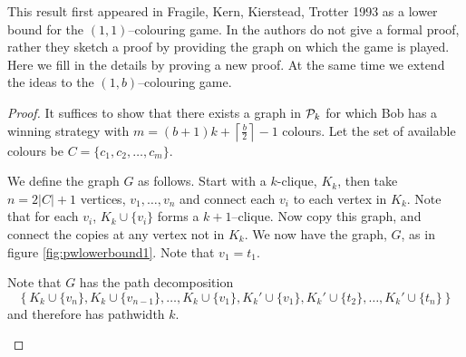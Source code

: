 This result first appeared in Fragile, Kern, Kierstead, Trotter 1993 \cite{faKeKiTr1993} as a lower bound for the $(1,1)$--colouring game. In \cite{faKeKiTr1993} the authors do not give a formal proof, rather they sketch a proof by providing the graph on which the game is played. Here we fill in the details by proving a new proof. At the same time we  extend the ideas to the $(1,b)$--colouring game.
\begin{proof}
    It suffices to show that there exists a graph in $\mathcal{P}_k$ for which Bob has a winning strategy with $m=(b+1)k+\left\lceil\frac{b}{2}\right\rceil-1$ colours. Let the set of available colours be $C=\{c_1,c_2,\dots,c_m\}$.
    
    We define the graph $G$ as follows. Start with a $k$-clique, $K_k$, then take $n=2|C|+1$ vertices, $v_1,\dots,v_n$ and connect each $v_i$ to each vertex in $K_k$. Note that for each $v_i$, $K_k\cup\{v_i\}$ forms a $k+1$--clique. Now copy this graph, and connect the copies at any vertex not in $K_k$. We now have the graph, $G$, as in figure \ref{fig:pwlowerbound1}. Note that $v_1=t_1$. 
    
    Note that $G$ has the path decomposition \[\left\{K_k\cup\{v_n\}, K_k\cup\{v_{n-1}\}, \dots, K_k\cup\{v_1\}, K_k'\cup\{v_1\}, K_k'\cup\{t_2\}, \dots, K_k'\cup\{t_n\}\right\}\] and therefore has pathwidth $k$.
\begin{figure}[H]
    \centering
{}
\end{figure}
\end{proof}
